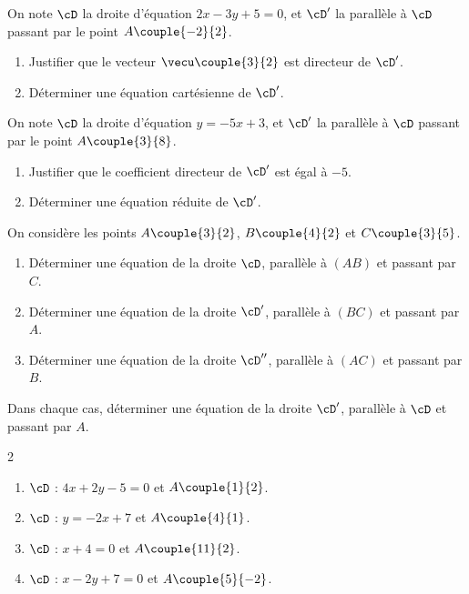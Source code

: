 
\exo

On note $\cD$ la droite d'équation $2x-3y+5=0$, et $\cD'$ la parallèle à $\cD$ passant par le point $A\couple{-2}{2}$.
\begin{enumerate}
\item Justifier que le vecteur $\vecu\couple{3}{2}$ est directeur de $\cD'$.
\item Déterminer une équation cartésienne de $\cD'$.
\end{enumerate}

\exo

On note $\cD$ la droite d'équation $y=-5x+3$, et $\cD'$ la parallèle à $\cD$ passant par le point $A\couple{3}{8}$.
\begin{enumerate}
\item Justifier que le coefficient directeur de $\cD'$ est égal à $-5$.
\item Déterminer une équation réduite de $\cD'$.
\end{enumerate}

\exo

On considère les points $A\couple{3}{2}$, $B\couple{4}{2}$ et $C\couple{3}{5}$.
\begin{enumerate}
\item Déterminer une équation de la droite $\cD$, parallèle à $(AB)$ et passant par $C$.
\item Déterminer une équation de la droite $\cD'$, parallèle à $(BC)$ et passant par $A$.
\item Déterminer une équation de la droite $\cD''$, parallèle à $(AC)$ et passant par $B$.
\end{enumerate}

\exo

Dans chaque cas, déterminer une équation de la droite $\cD'$, parallèle à $\cD$ et passant par $A$.
\vspace{-6pt}
\setlength{\columnsep}{1cm}
\setlength{\columnseprule}{0pt}
\begin{multicols}{2}
\begin{enumerate}
\item $\cD$ : $4x+2y-5=0$ et $A\couple{1}{2}$.
\medskip
\item $\cD$ : $y=-2x+7$ et $A\couple{4}{1}$.
\item $\cD$ : $x+4=0$ et $A\couple{11}{2}$.
\medskip
\item $\cD$ : $x-2y+7=0$ et $A\couple{5}{-2}$.
\end{enumerate}
\end{multicols}
\vspace{-8pt}

